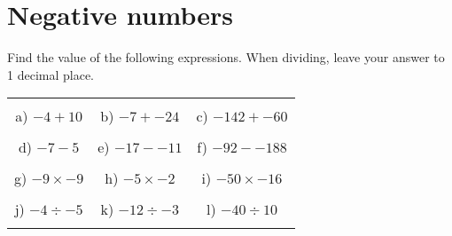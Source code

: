 \documentclass[12pt]{article}
\begin{document}
\pagestyle{fancy}
\fancyfoot{} 
\section{Negative numbers}
Find the value of the following expressions. When dividing, leave your answer to 1 decimal place.
\begin{table}[h!]
\centering
\begin{tabular}{c c c}
\hspace{5cm} & \hspace{5cm} & \hspace{5cm} \\
a) ${-4} + {10}$ & b) ${-7} + {-24}$ & c) ${-142} + {-60}$ \\ \\
d) ${-7} - {5}$ & e) ${-17} - {-11}$ & f) ${-92} - {-188}$ \\ \\
g) ${-9}\times{-9}$ & h) ${-5}\times{-2}$ & i) ${-50}\times{-16}$ \\ \\
j) ${-4}\div{-5}$ & k) ${-12}\div{-3}$ & l) ${-40}\div{10}$ \\ \\
\end{tabular}
\end{table}
\newline
\end{document}
